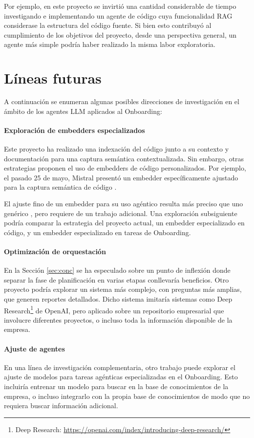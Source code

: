 Por ejemplo, en este proyecto se invirtió una cantidad considerable de tiempo investigando e implementando un agente de código cuya funcionalidad RAG considerase la estructura del código fuente. Si bien esto contribuyó al cumplimiento de los objetivos del proyecto, desde una perspectiva general, un agente más simple podría haber realizado la misma labor exploratoria.

\section{Líneas futuras}
A continuación se enumeran algunas posibles direcciones de investigación en el ámbito de los agentes LLM aplicados al Onboarding:
\paragraph{Exploración de embedders especializados} Este proyecto ha realizado una indexación del código junto a su contexto y documentación para una captura semántica contextualizada. Sin embargo, otras estrategias proponen el uso de embedders de código personalizados. Por ejemplo, el pasado 25 de mayo, Mistral presentó un embedder específicamente ajustado para la captura semántica de código \cite{noauthor_codestral_nodate}.

El ajuste fino de un embedder para su uso agéntico resulta más preciso que uno genérico \cite{khattab_relevance-guided_2021,xiong_approximate_2020,yu_augmentation-adapted_2023}, pero requiere de un trabajo adicional. Una exploración subsiguiente podría comparar la estrategia del proyecto actual, un embedder especializado en código, y un embedder especializado en tareas de Onboarding.

\paragraph{Optimización de orquestación} En la Sección \ref{sec:conc} se ha especulado sobre un punto de inflexión donde separar la fase de planificación en varias etapas conllevaría beneficios. Otro proyecto podría explorar un sistema más complejo, con preguntas más amplias, que generen reportes detallados. Dicho sistema imitaría sistemas como Deep Research\footnote{Deep Research: \url{https://openai.com/index/introducing-deep-research/}} de OpenAI, pero aplicado sobre un repositorio empresarial que involucre diferentes proyectos, o incluso toda la información disponible de la empresa.

\paragraph{Ajuste de agentes} En una línea de investigación complementaria, otro trabajo puede explorar el ajuste de modelos para tareas agénticas especializadas en el Onboarding. Esto incluiría entrenar un modelo para buscar en la base de conocimientos de la empresa, o incluso integrarlo con la propia base de conocimientos de modo que no requiera buscar información adicional.
